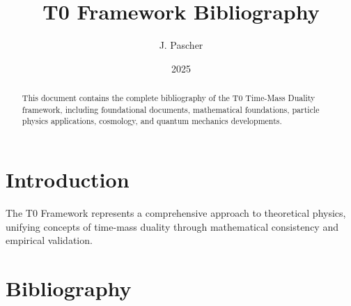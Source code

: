 \documentclass{article}
\begin{document}
	
	\title{T0 Framework Bibliography}
	\author{J. Pascher}
	\date{2025}
	\maketitle
	
	\begin{abstract}
		This document contains the complete bibliography of the T0 Time-Mass Duality framework, including foundational documents, mathematical foundations, particle physics applications, cosmology, and quantum mechanics developments.
	\end{abstract}
	
	\tableofcontents
	
	\section{Introduction}
	The T0 Framework represents a comprehensive approach to theoretical physics, unifying concepts of time-mass duality through mathematical consistency and empirical validation.
	
	\section{Bibliography}
	
\end{document}
